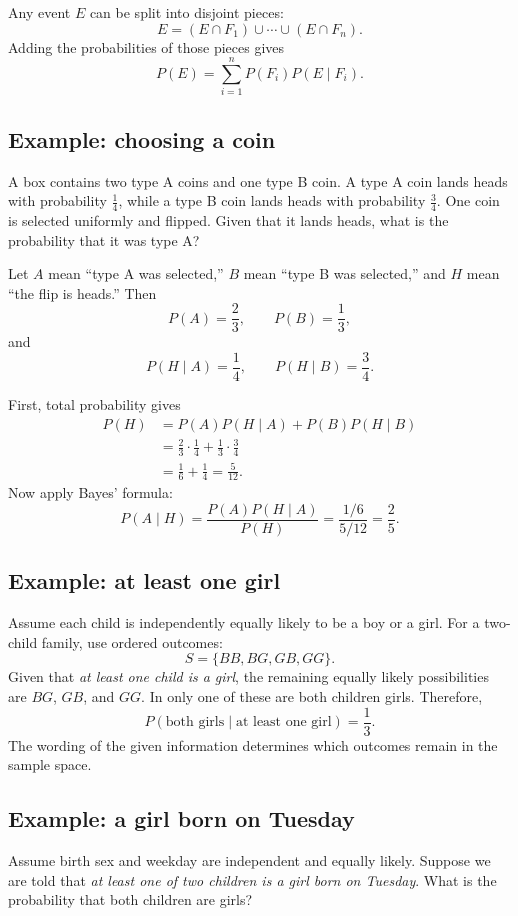 \documentclass[11pt]{article}
\begin{document}
Any event $E$ can be split into disjoint pieces:
\[
E=(E\cap F_1)\cup\cdots\cup(E\cap F_n).
\]
Adding the probabilities of those pieces gives
\[
\boxed{
P(E)=\sum_{i=1}^{n}P(F_i)P(E\mid F_i).
}
\]

\subsection{Example: choosing a coin}

A box contains two type A coins and one type B coin. A type A coin
lands heads with probability $\tfrac14$, while a type B coin lands
heads with probability $\tfrac34$. One coin is selected uniformly
and flipped. Given that it lands heads, what is the probability
that it was type A?

Let $A$ mean ``type A was selected,'' $B$ mean ``type B was
selected,'' and $H$ mean ``the flip is heads.'' Then
\[
P(A)=\frac23,\qquad P(B)=\frac13,
\]
and
\[
P(H\mid A)=\frac14,\qquad P(H\mid B)=\frac34.
\]

First, total probability gives
\[
\begin{aligned}
P(H)
&=P(A)P(H\mid A)+P(B)P(H\mid B)\\
&=\frac23\cdot\frac14+\frac13\cdot\frac34\\
&=\frac16+\frac14=\frac5{12}.
\end{aligned}
\]
Now apply Bayes' formula:
\[
\boxed{
P(A\mid H)
=\frac{P(A)P(H\mid A)}{P(H)}
=\frac{1/6}{5/12}
=\frac25.
}
\]

\subsection{Example: at least one girl}

Assume each child is independently equally likely to be a boy or
a girl. For a two-child family, use ordered outcomes:
\[
S=\{BB,BG,GB,GG\}.
\]
Given that \emph{at least one child is a girl}, the remaining
equally likely possibilities are $BG$, $GB$, and $GG$. In only one
of these are both children girls. Therefore,
\[
\boxed{
P(\text{both girls}\mid\text{at least one girl})=\frac13.
}
\]
The wording of the given information determines which outcomes
remain in the sample space.

\subsection{Example: a girl born on Tuesday}

Assume birth sex and weekday are independent and equally likely.
Suppose we are told that \emph{at least one of two children is a
girl born on Tuesday}. What is the probability that both children
are girls?
\end{document}
